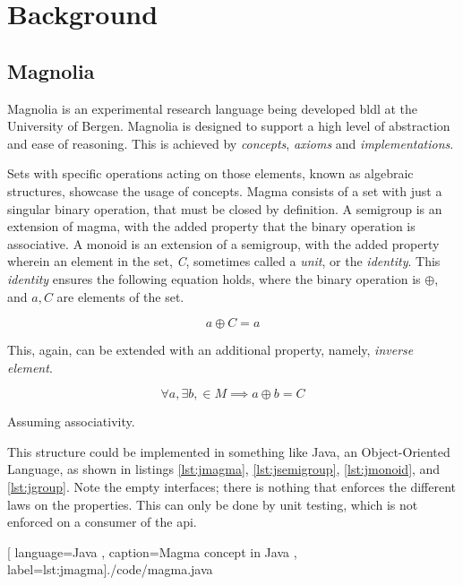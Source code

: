 \chapter{Background}

\section{Magnolia}

Magnolia is an experimental research language being developed \gls{bldl} at the
University of Bergen. Magnolia is designed to support a high level of abstraction
and ease of reasoning. This is achieved by \textit{concepts}, \textit{axioms} and
\textit{implementations}.


Sets with specific operations acting on those elements, known as algebraic
structures, showcase the usage of concepts. Magma consists of a set with just a
singular binary operation, that must be closed by definition. A semigroup is an
extension of magma, with the added property that the binary operation is
associative. A monoid is an extension of a semigroup, with the added property
wherein an element in the set, \textit{C}, sometimes called a \textit{unit}, or
the \textit{identity}. This \textit{identity} ensures the following equation
holds, where the binary operation is $ \oplus $, and $ a, C $ are elements of the set.

\begin{equation}
  a \oplus C = a
\end{equation}

This, again, can be extended with an additional property, namely,
\textit{inverse element}.

\begin{equation}
  \forall a, \exists b, \in M \implies a \oplus b = C
\end{equation}

Assuming associativity.

This structure could be implemented in something like Java, an Object-Oriented
Language, as shown in listings \ref{lst:jmagma}, \ref{lst:jsemigroup},
\ref{lst:jmonoid}, and \ref{lst:jgroup}. Note the empty interfaces; there is
nothing that enforces the different laws on the properties. This can only be
done by unit testing, which is not enforced on a consumer of the \gls{api}.

\begin{center}
  
    [ language=Java
    , caption={Magma concept in Java}
    , label=lst:jmagma]{./code/magma.java}
\end{center}

